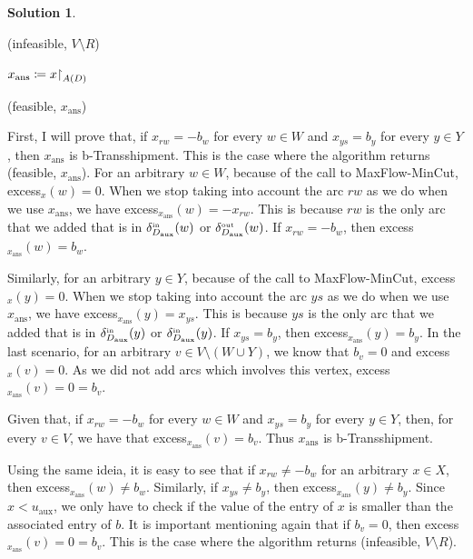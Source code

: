 \documentclass[11pt,leqno,final]{amsart}
\theoremstyle{definition}
\newtheorem{solution}{Solution}
\begin{document}
\begin{solution}
\begin{algorithm}
\begin{algorithmic}
              
                \State \Return (infeasible, $V \setminus R$)
              \EndIf
        
            \EndIf

          \EndFor

          \State $x_{\text{ans}} \coloneqq x \restrict{A(D)}$ 

      
          \State \Return (feasible, $x_{\text{ans}}$)
            
        \end{algorithmic}
      \end{algorithm}

    First, I will prove that, if $x_{rw} = -b_w$ for every $w \in W$ and $x_{ys} = b_y$ for every $y \in Y$, then $x_{\text{ans}}$ is b-Transshipment. This is the case where the algorithm returns (feasible, $x_{\text{ans}}$). For an arbitrary $w \in W$, because of the call to MaxFlow-MinCut, excess$_x(w) = 0$. When we stop taking into account the arc $rw$ as we do when we use $x_{\text{ans}}$, we have excess$_{x_{\text{ans}}}(w) = - x_{rw}$. This is because $rw$ is the only arc that we added that is in $\deltain[D_{\text{aux}}](w)$ or $\deltaout[D_{\text{aux}}](w)$. If $x_{rw} = -b_w$, then excess$_{x_{\text{ans}}}(w) = b_w$.

    Similarly, for an arbitrary $y \in Y$, because of the call to MaxFlow-MinCut, excess$_x(y) = 0$. When we stop taking into account the arc $ys$ as we do when we use $x_{\text{ans}}$, we have excess$_{x_{\text{ans}}}(y) = x_{ys}$. This is because $ys$ is the only arc that we added that is in $\deltain[D_{\text{aux}}](y)$ or $\deltain[D_{\text{aux}}](y)$. If $x_{ys} = b_y$, then excess$_{x_{\text{ans}}}(y) = b_y$. In the last scenario, for an arbitrary $v \in V \setminus (W \cup Y)$, we know that $b_v = 0$ and excess$_x(v) = 0$. As we did not add arcs which involves this vertex, excess$_{x_{\text{ans}}}(v) = 0 = b_v$.

    Given that, if $x_{rw} = -b_w$ for every $w \in W$ and $x_{ys} = b_y$ for every $y \in Y$, then, for every $v \in V$, we have that excess$_{x_{\text{ans}}}(v) = b_v$. Thus $x_{\text{ans}}$ is b-Transshipment.

    Using the same ideia, it is easy to see that if $x_{rw} \neq -b_w$ for an arbitrary $x \in X$, then excess$_{x_{\text{ans}}}(w) \neq b_w$. Similarly, if $x_{ys} \neq b_y$, then excess$_{x_{\text{ans}}}(y) \neq b_y$. Since $x < u_{\text{aux}}$, we only have to check if the value of the entry of $x$ is smaller than the associated entry of $b$. It is important mentioning again that if $b_v = 0$, then excess$_{x_{\text{ans}}}(v) = 0 = b_v$. This is the case where the algorithm returns (infeasible, $V \setminus R$). 


\end{solution}
\end{document}
